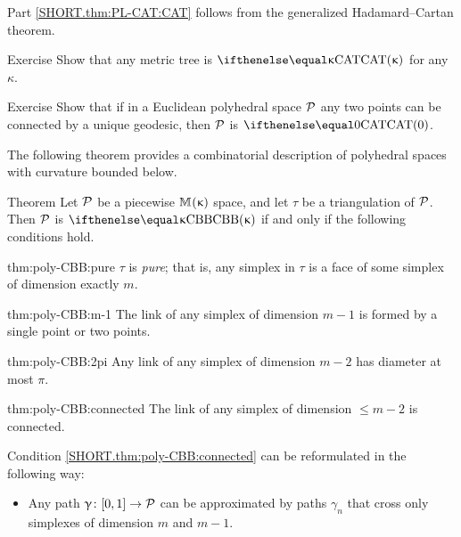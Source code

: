 Part \ref{SHORT.thm:PL-CAT:CAT} follows from the generalized Hadamard--Cartan theorem.
\qeds

\begin{thm}{Exercise}\label{ex:metric tree}
Show that any metric tree is $\CAT\kappa$ for any $\kappa$.
\end{thm}


\begin{thm}{Exercise}\label{ex:poly-unique-geodesic}
Show that if in a Euclidean polyhedral space $\mathcal{P}$
any two points can be connected by a unique geodesic,  
then $\mathcal{P}$ is $\CAT0$.
\end{thm}

The following theorem provides a combinatorial description of polyhedral spaces with curvature bounded below.

\begin{thm}{Theorem}\label{thm:poly-CBB} 
Let $\mathcal{P}$ be a piecewise
$\mathbb{M}_{{}}^{}({\upkappa})$ space, and let $\tau$ be a triangulation of $\mathcal{P}$.
Then $\mathcal{P}$ is $\Alex\kappa$ if and only if the following conditions hold.

\begin{subthm}{thm:poly-CBB:pure} $\tau$ is \emph{pure}; 
that is, any simplex in $\tau$ is  a face of some simplex of dimension exactly $m$. 
\end{subthm}

\begin{subthm}{thm:poly-CBB:m-1}
The link of any simplex of dimension $m-1$ is formed by a single point or two points.
\end{subthm}

\begin{subthm}{thm:poly-CBB:2pi}
Any link of any simplex of dimension $m-2$
has diameter at most $\pi$.
\end{subthm}

\begin{subthm}{thm:poly-CBB:connected}
The link of any simplex of dimension $\le m-2$ is connected.
\end{subthm}

\end{thm}

Condition \ref{SHORT.thm:poly-CBB:connected}
can be reformulated in the following way:

\begin{itemize}
\item[\ref{SHORT.thm:poly-CBB:connected}\,$'$]
Any path $\gamma\:[0,1]\to \spc{P}$ can be approximated by paths
$\gamma_n$ 
that cross only simplexes of dimension $m$ and $m-1$.
\end{itemize}

